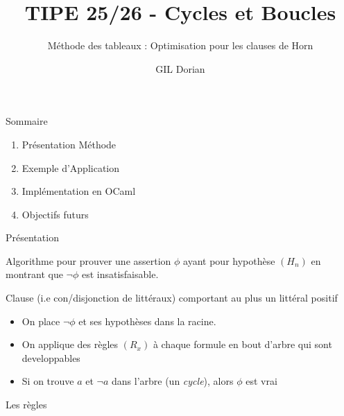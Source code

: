 \documentclass[]{beamer}
\title{TIPE 25/26 - Cycles et Boucles}
\author{GIL Dorian}
\subtitle{Méthode des tableaux : Optimisation pour les clauses de Horn}
\date{}
\begin{document}
\begin{frame}
\titlepage
\end{frame}

\begin{frame}{Sommaire}
\begin{enumerate}
    \item Présentation Méthode
    \item Exemple d'Application
    \item Implémentation en OCaml
    \item Objectifs futurs
\end{enumerate}
\end{frame}

\begin{frame}{Présentation}
    \begin{definition}
        Algorithme pour prouver une assertion $\phi$ ayant pour hypothèse $(H_n)$ en montrant
        que $\lnot \phi$ est insatisfaisable.
    \end{definition}
    \begin{definition}
        Clause (i.e con/disjonction de littéraux) comportant au plus un littéral positif
    \end{definition}
    \pause
    \begin{itemize}
        \item On place $\lnot\phi$ et ses hypothèses dans la racine.
        \item On applique des règles $(R_x)$ à chaque formule en bout d'arbre qui sont developpables
        \item Si on trouve $a$ et $\lnot a$ dans l'arbre (un \textit{cycle}), alors $\phi$ est vrai
    \end{itemize}
    \pause
    Les règles
\end{frame}
\end{document}
